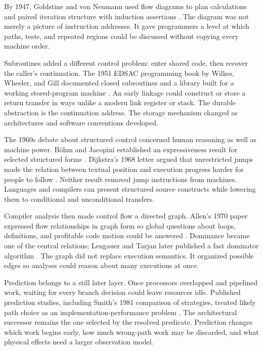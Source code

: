 By 1947, Goldstine and von Neumann used flow diagrams to plan calculations and
paired iteration structure with induction assertions
\autocite{goldstine1947planning}. The diagram was not merely a picture of
instruction addresses. It gave programmers a level at which paths, tests, and
repeated regions could be discussed without copying every machine order.

Subroutines added a different control problem: enter shared code, then recover
the caller's continuation. The 1951 EDSAC programming book by Wilkes, Wheeler,
and Gill documented closed subroutines and a library built for a working
stored-program machine \autocite{wilkes1951preparation}. An early linkage could
construct or store a return transfer in ways unlike a modern link register or
stack. The durable abstraction is the continuation address. The storage
mechanism changed as architectures and software conventions developed.

The 1960s debate about structured control concerned human reasoning as well as
machine power. Böhm and Jacopini established an expressiveness result for
selected structured forms \autocite{bohm1966flow}. Dijkstra's 1968 letter
argued that unrestricted jumps made the relation between textual position and
execution progress harder for people to follow
\autocite{dijkstra1968goto}. Neither result removed jump instructions from
machines. Languages and compilers can present structured source constructs
while lowering them to conditional and unconditional transfers.

Compiler analysis then made control flow a directed graph. Allen's 1970 paper
expressed flow relationships in graph form so global questions about loops,
definitions, and profitable code motion could be answered
\autocite{allen1970control}. Dominance became one of the central relations;
Lengauer and Tarjan later published a fast dominator algorithm
\autocite{lengauertarjan1979dominators}. The graph did not replace execution
semantics. It organized possible edges so analyses could reason about many
executions at once.

Prediction belongs to a still later layer. Once processors overlapped and
pipelined work, waiting for every branch decision could leave resources idle.
Published prediction studies, including Smith's 1981 comparison of strategies,
treated likely path choice as an implementation-performance problem
\autocite{smith1981branch}. The architectural successor remains the one
selected by the resolved predicate. Prediction changes which work begins
early, how much wrong-path work may be discarded, and what physical effects
need a larger observation model.


